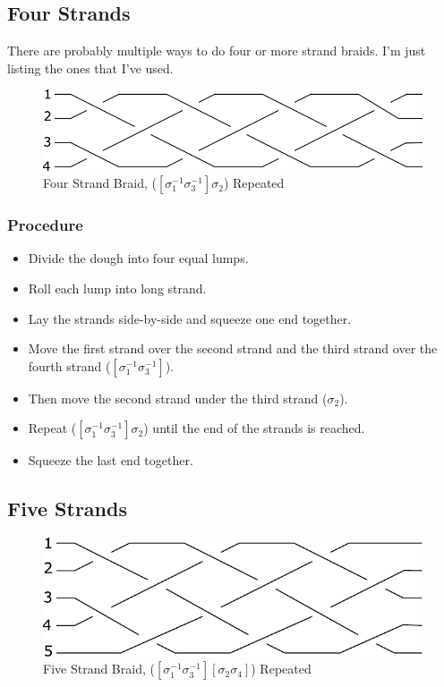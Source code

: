 \documentclass[10pt, openany]{book}
\begin{document}
\subsection{Four Strands}
There are probably multiple ways to do four or more strand braids.  I'm just listing the ones that I've used.

\begin{figure}[h]
  \center
  \includegraphics{Figures/4-strands.pdf}
  \caption{Four Strand Braid, ($[\sigma^{-1}_1\sigma^{-1}_3]\sigma_2$) Repeated}
  \label{fig:4Strand}
\end{figure}

\subsubsection{Procedure}
\begin{itemize}
  \item Divide the dough into four equal lumps.
  \item Roll each lump into long strand.
  \item Lay the strands side-by-side and squeeze one end together.
  \item Move the first strand over the second strand and the third strand over the fourth strand ($[\sigma^{-1}_1\sigma^{-1}_3]$).
  \item Then move the second strand under the third strand ($\sigma_2$).
  \item Repeat ($[\sigma^{-1}_1\sigma^{-1}_3]\sigma_2$) until the end of the strands is reached.
  \item Squeeze the last end together.
\end{itemize}

\subsection{Five Strands}

\begin{figure}[h]
  \center
  \includegraphics{Figures/5-strands.pdf}
  \caption{Five Strand Braid, ($[\sigma^{-1}_1 \sigma^{-1}_3][\sigma_2\sigma_4]$) Repeated}
  \label{fig:5Strand}
\end{figure}
\end{document}
